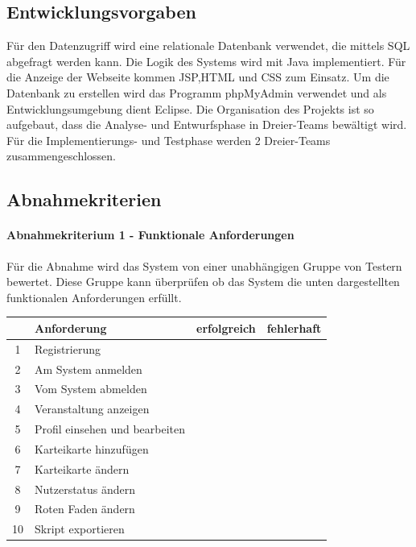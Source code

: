 \documentclass[12pt,a4paper]{article}
\begin{document}
{\subsection{Entwicklungsvorgaben}
Für den Datenzugriff wird eine relationale Datenbank verwendet, die mittels SQL abgefragt werden kann. Die Logik des Systems wird mit Java implementiert. Für die Anzeige der Webseite kommen JSP,HTML und CSS zum Einsatz. Um die Datenbank zu erstellen wird das Programm phpMyAdmin verwendet und als Entwicklungsumgebung dient Eclipse. Die Organisation des Projekts ist so aufgebaut, dass die Analyse- und Entwurfsphase in Dreier-Teams bewältigt wird. Für die Implementierungs- und Testphase werden 2 Dreier-Teams zusammengeschlossen.

\subsection{Abnahmekriterien}


\paragraph{Abnahmekriterium 1 - Funktionale Anforderungen}
Für die Abnahme wird das System von einer unabhängigen Gruppe von Testern bewertet. Diese Gruppe kann überprüfen ob das System die unten dargestellten funktionalen Anforderungen erfüllt.\\

\begin{tabular}{|c|l|c|c|}
	\hline  & Anforderung  & erfolgreich & fehlerhaft \\ 
	\hline 1 & Registrierung &  &  \\ 
	\hline 2 & Am System anmelden &  &  \\ 
	\hline 3 & Vom System abmelden &  &  \\ 
	\hline 4 & Veranstaltung anzeigen &  &  \\ 
	\hline 5 & Profil einsehen und bearbeiten &  &  \\ 
	\hline 6 & Karteikarte hinzufügen &  &  \\ 
	\hline 7 & Karteikarte ändern &  &  \\ 
	\hline 8 & Nutzerstatus ändern &  &  \\ 
	\hline 9 & Roten Faden ändern &  &  \\ 
	\hline 10& Skript exportieren &  &  \\ 
	\hline 
\end{tabular}\\ 



}
\end{document}
